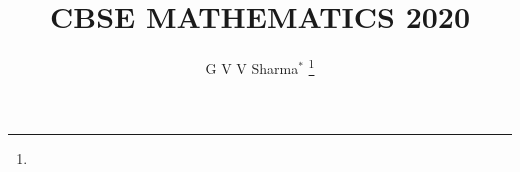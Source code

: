 \documentclass[journal,12pt,twocolumn]{IEEEtran}
\DeclareMathOperator*{\Res}{Res}
\begin{document}
\newtheorem{theorem}{Theorem}[section]
\newtheorem{problem}{Problem}
\newtheorem{proposition}{Proposition}[section]
\newtheorem{lemma}{Lemma}[section]
\newtheorem{corollary}[theorem]{Corollary}
\newtheorem{example}{Example}[section]
\newtheorem{definition}[problem]{Definition}
\newcommand{\BEQA}{\begin{eqnarray}}
\newcommand{\EEQA}{\end{eqnarray}}
\newcommand{\define}{\stackrel{\triangle}{=}}

\providecommand{\mbf}{\mathbf}
\providecommand{\pr}[1]{\ensuremath{\Pr\left(#1\right)}}
\providecommand{\qfunc}[1]{\ensuremath{Q\left(#1\right)}}
\providecommand{\sbrak}[1]{\ensuremath{{}\left[#1\right]}}
\providecommand{\lsbrak}[1]{\ensuremath{{}\left[#1\right.}}
\providecommand{\rsbrak}[1]{\ensuremath{{}\left.#1\right]}}
\providecommand{\brak}[1]{\ensuremath{\left(#1\right)}}
\providecommand{\lbrak}[1]{\ensuremath{\left(#1\right.}}
\providecommand{\rbrak}[1]{\ensuremath{\left.#1\right)}}
\providecommand{\cbrak}[1]{\ensuremath{\left\{#1\right\}}}
\providecommand{\lcbrak}[1]{\ensuremath{\left\{#1\right.}}
\providecommand{\rcbrak}[1]{\ensuremath{\left.#1\right\}}}
\theoremstyle{remark}
\newtheorem{rem}{Remark}
\newcommand{\sgn}{\mathop{\mathrm{sgn}}}
\providecommand{\abs}[1]{\left\vert#1\right\vert}
\providecommand{\res}[1]{\Res\displaylimits_{#1}} 
\providecommand{\norm}[1]{\left\lVert#1\right\rVert}
\providecommand{\mtx}[1]{\mathbf{#1}}
\providecommand{\mean}[1]{E\left[ #1 \right]}
\providecommand{\fourier}{\overset{\mathcal{F}}{ \rightleftharpoons}}
\providecommand{\system}{\overset{\mathcal{H}}{ \longleftrightarrow}}
\newcommand{\solution}{\noindent \textbf{Solution: }}
\newcommand{\cosec}{\,\text{cosec}\,}
\providecommand{\dec}[2]{\ensuremath{\overset{#1}{\underset{#2}{\gtrless}}}}
\newcommand{\myvec}[1]{\ensuremath{\begin{pmatrix}#1\end{pmatrix}}}
\newcommand{\mydet}[1]{\ensuremath{\begin{vmatrix}#1\end{vmatrix}}}
\makeatletter
{}
\makeatother
\let\StandardTheFigure\thefigure
\let\vec\mathbf
\renewcommand{\thefigure}{\theproblem}
\def\putbox#1#2#3{\makebox[0in][l]{\makebox[#1][l]{}\raisebox{\baselineskip}[0in][0in]{\raisebox{#2}[0in][0in]{#3}}}}
     \def\rightbox#1{\makebox[0in][r]{#1}}
     \def\centbox#1{\makebox[0in]{#1}}
     \def\topbox#1{\raisebox{-\baselineskip}[0in][0in]{#1}}
     \def\midbox#1{\raisebox{-0.5\baselineskip}[0in][0in]{#1}}
\vspace{3cm}
\title{CBSE MATHEMATICS 2020}
\author{G V V Sharma$^{*}$
	\thanks{}
}
\maketitle
\newpage
\bigskip
\renewcommand{\thefigure}{\theenumi}
\renewcommand{\thetable}{\theenumi}
\end{document}
